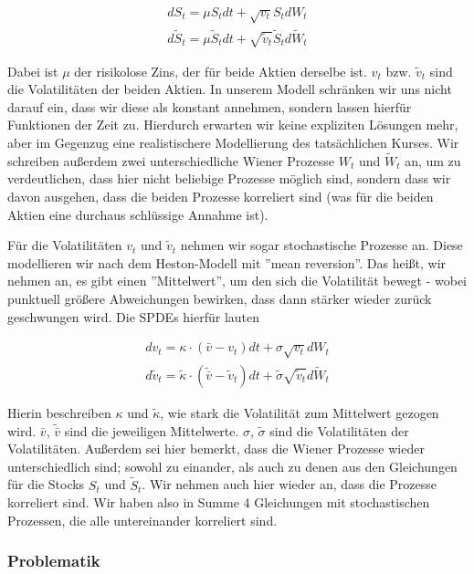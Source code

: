 \documentclass[12pt]{article}
\begin{document}
\begin{align}\label{SPDEstock}
dS_t = \mu S_t dt + \sqrt{v_t} S_t dW_t \\
d\tilde{S}_t = \mu \tilde{S}_t dt + \sqrt{\tilde{v}_t} \tilde{S}_t d\tilde{W}_t
\end{align}

Dabei ist $\mu$ der risikolose Zins, der für beide Aktien derselbe ist. $v_t$ bzw. $\tilde{v}_t$ sind die Volatilitäten der beiden Aktien. In unserem Modell schränken wir uns nicht darauf ein, dass wir diese als konstant annehmen, sondern lassen hierfür Funktionen der Zeit zu. Hierdurch erwarten wir keine expliziten Lösungen mehr, aber im Gegenzug eine realistischere Modellierung des tatsächlichen Kurses. Wir schreiben außerdem zwei unterschiedliche Wiener Prozesse $W_t$ und $\tilde{W}_t$ an, um zu verdeutlichen, dass hier nicht beliebige Prozesse möglich sind, sondern dass wir davon ausgehen, dass die beiden Prozesse korreliert sind (was für die beiden Aktien eine durchaus schlüssige Annahme ist).

Für die Volatilitäten $v_t$ und $\tilde{v}_t$ nehmen wir sogar stochastische Prozesse an. Diese modellieren wir nach dem Heston-Modell mit ''mean reversion''. Das heißt, wir nehmen an, es gibt einen ''Mittelwert'', um den sich die Volatilität bewegt - wobei punktuell größere Abweichungen bewirken, dass dann stärker wieder zurück geschwungen wird. Die SPDEs hierfür lauten

\begin{align} \label{SPDEvol}
dv_t = \kappa\cdot(\bar{v}-v_t) dt + \sigma \sqrt{v_t}dW_t \\
d\tilde{v}_t = \tilde{\kappa}\cdot(\tilde{\bar{v}}-\tilde{v}_t) dt + \tilde{\sigma} \sqrt{\tilde{v}_t}d\tilde{W}_t
\end{align}

Hierin beschreiben $\kappa$ und $\tilde{\kappa}$, wie stark die Volatilität zum Mittelwert gezogen wird. $\bar{v}$, $\tilde{\bar{v}}$ sind die jeweiligen Mittelwerte. $\sigma$, $\tilde{\sigma}$ sind die Volatilitäten der Volatilitäten. Außerdem sei hier bemerkt, dass die Wiener Prozesse wieder unterschiedlich sind; sowohl zu einander, als auch zu denen aus den Gleichungen für die Stocks $S_t$ und $\tilde{S}_t$. Wir nehmen auch hier wieder an, dass die Prozesse korreliert sind. Wir haben also in Summe 4 Gleichungen mit stochastischen Prozessen, die alle untereinander korreliert sind.


\subsubsection{Problematik}
\end{document}
